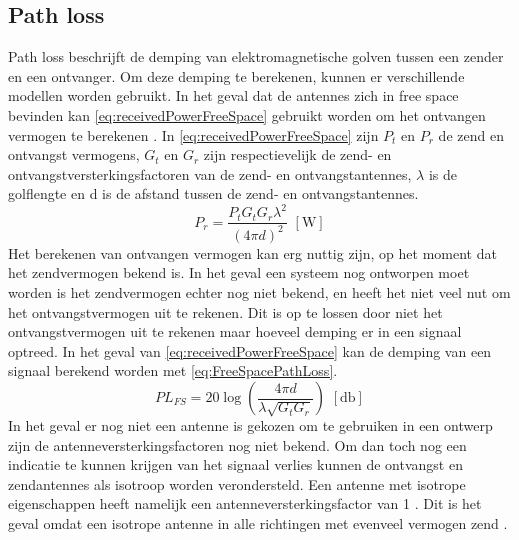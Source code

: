 \subsection{Path loss}
Path loss beschrijft de demping van elektromagnetische golven tussen een zender en een ontvanger. Om deze demping te berekenen, kunnen er verschillende modellen worden gebruikt. In het geval dat de antennes zich in free space bevinden kan \autoref{eq:receivedPowerFreeSpace} gebruikt worden om het ontvangen vermogen te berekenen \cite[13]{bensky2019shortRangeWirelessCommunication}. In \autoref{eq:receivedPowerFreeSpace} zijn \(P_t\) en \(P_r\) de zend en ontvangst vermogens, \(G_t\) en \(G_r\) zijn respectievelijk de zend- en ontvangstversterkingsfactoren van de zend- en ontvangstantennes, \(\lambda\) is de golflengte en d is de afstand tussen de zend- en ontvangstantennes. 
\begin{equation}\label{eq:receivedPowerFreeSpace}
    P_r=\frac{P_tG_tG_r\lambda^2}{\left(4\pi d\right)^2} \,\,\left[\unit{\watt}\right]
\end{equation}
Het berekenen van ontvangen vermogen kan erg nuttig zijn, op het moment dat het zendvermogen bekend is. In het geval een systeem nog ontworpen moet worden is het zendvermogen echter nog niet bekend, en heeft het niet veel nut om het ontvangstvermogen uit te rekenen. Dit is op te lossen door niet het ontvangstvermogen uit te rekenen maar hoeveel demping er in een signaal optreed. In het geval van \autoref{eq:receivedPowerFreeSpace} kan de demping van een signaal berekend worden met \autoref{eq:FreeSpacePathLoss}.
\begin{equation}\label{eq:FreeSpacePathLoss}
    PL_{FS}=20\log\left(\frac{4\pi d}{\lambda\sqrt{G_tG_r}}\right) \,\,\left[\unit{\decibel}\right]
\end{equation}
In het geval er nog niet een antenne is gekozen om te gebruiken in een ontwerp zijn de antenneversterkingsfactoren nog niet bekend. Om dan toch nog een indicatie te kunnen krijgen van het signaal verlies kunnen de ontvangst en zendantennes als isotroop worden verondersteld. Een antenne met isotrope eigenschappen heeft namelijk een antenneversterkingsfactor van 1 \cite{bensky2019shortRangeWirelessCommunication}. Dit is het geval omdat een isotrope antenne in alle richtingen met evenveel vermogen zend \cite{bensky2019shortRangeWirelessCommunication}.

